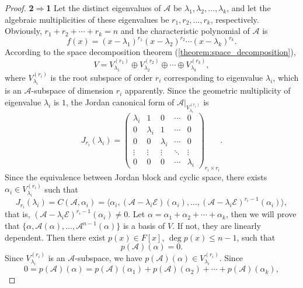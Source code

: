 \documentclass[11pt]{../../TexTemplate/elegantbook} %
\begin{document}
\begin{proof}
{\color{blue!60}\textbf{2}\(\Rightarrow\)\textbf{1}}
Let the distinct eigenvalues of \( \mathcal{A} \) be \( \lambda_1, \lambda_2, \dots, \lambda_k \),
and let the algebraic multiplicities of these eigenvalues be \( r_1, r_2, \dots, r_k \), respectively.
Obviously, \( r_1 + r_2 + \cdots + r_k = n \) and the characteristic polynomial of \( \mathcal{A} \) is
\[
f(x) = (x - \lambda_1)^{r_1} (x - \lambda_2)^{r_2} \cdots (x - \lambda_k)^{r_k}.
\]
According to the space decomposition theorem (\ref{theorem:space_decomposition}),
\[
V = V_{\lambda_1}^{(r_1)} \oplus V_{\lambda_2}^{(r_2)} \oplus \cdots \oplus V_{\lambda_k}^{(r_k)},
\]
where \( V_{\lambda_i}^{(r_i)}\) is the root subspace of order \( r_i \) corresponding to eigenvalue \( \lambda_i \),
which is an \( \mathcal{A} \)-subspace of dimension \( r_i \) apparently.
\newline Since the geometric multiplicity of eigenvalue \( \lambda_i \) is \( 1 \),
the Jordan canonical form of \( \mathcal{A}|_{V_{\lambda_i}^{(r_i)}} \) is
\[
J_{r_i}(\lambda_i) = \begin{pmatrix}
\lambda_i & 1 & 0 & \cdots & 0 \\
0 & \lambda_i & 1 & \cdots & 0 \\
0 & 0 & \lambda_i & \cdots & 0 \\
\vdots & \vdots & \vdots & \ddots & \vdots\\
0 & 0 & 0 & \cdots & \lambda_i
\end{pmatrix}_{r_i \times r_i}.
\]
Since the equivalence between Jordan block and cyclic space,
there exists \(\alpha_{i}\in V_{\lambda_i}^{(r_i)}\) such that
\[
J_{r_i}(\lambda_i) = C(\mathcal{A}, \alpha_{i}) 
= \langle \alpha_{i}, (\mathcal{A} - \lambda_i \mathcal{E})(\alpha_{i}), \ldots, 
(\mathcal{A} - \lambda_i \mathcal{E})^{r_i - 1}(\alpha_{i}) \rangle,
\]
that is, \((\mathcal{A} - \lambda_i \mathcal{E})^{r_i - 1}(\alpha_{i}) \neq 0\).
\newline Let \(\alpha = \alpha_{1} + \alpha_{2} + \cdots + \alpha_{k}\),
then we will prove that \(\{ \alpha, \mathcal{A}(\alpha), \ldots, \mathcal{A}^{n-1}(\alpha) \}\)
is a basis of \( V \).
\newline If not, they are linearly dependent.
Then there exist \( p(x) \in F[x] \), \(\operatorname{deg} p(x) \leqslant  n-1\), such that
\[
p(\mathcal{A})(\alpha) = 0.
\]
Since \(V_{\lambda_i}^{(r_i)}\) is an \( \mathcal{A} \)-subspace, we have 
\(p(\mathcal{A})(\alpha) \in V_{\lambda_i}^{(r_i)}\).
\newline Since 
\[
0 = p(\mathcal{A})(\alpha) = p(\mathcal{A})(\alpha_{1}) + p(\mathcal{A})(\alpha_{2}) + \cdots + p(\mathcal{A})(\alpha_{k}),
\]
\end{proof}
\end{document}
